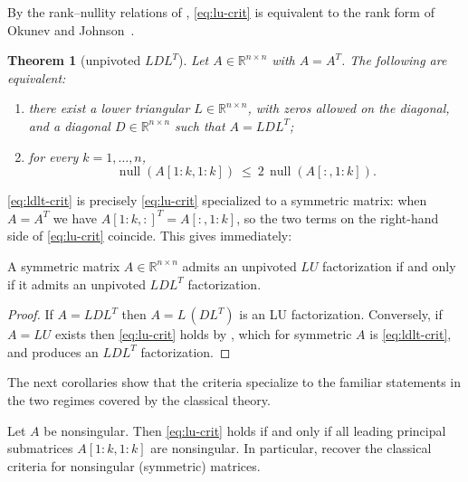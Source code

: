 \documentclass[preprint,12pt]{elsarticle}
\theoremstyle{plain}
\newtheorem{theorem}{Theorem}
\theoremstyle{nonumberplain}
\newtheorem{proof}{Proof}
\numberwithin{equation}{section}
\DeclareMathOperator{\nl}{null}
\newcommand{\by}{\times}
\numberwithin{theorem}{section}
\begin{document}
By the rank--nullity relations of , \cref{eq:lu-crit} is equivalent to the rank form of Okunev and Johnson~\cite{okunev_johnson_2005,johnson_okunev_2025}.

\begin{theorem}[unpivoted $LDL^T$]\label{thm:ldlt}
  Let $A \in \mathbb{R}^{n \by n}$ with $A = A^T$.  The following are equivalent:
  \begin{enumerate}
    \item there exist a lower triangular $L \in \mathbb{R}^{n \by n}$, with zeros allowed on the diagonal, and a diagonal $D \in \mathbb{R}^{n \by n}$ such that $A = LDL^T$;
    \item for every $k = 1, \ldots, n$,
      \begin{equation}\label{eq:ldlt-crit}
        \nl(A[1:k,1:k]) \ \le\ 2 \, \nl(A[:,1:k]) .
      \end{equation}
  \end{enumerate}
\end{theorem}

\cref{eq:ldlt-crit} is precisely \cref{eq:lu-crit} specialized to a symmetric matrix: when $A = A^T$ we have ${A[1:k,:]}^T = A[:,1:k]$, so the two terms on the right-hand side of \cref{eq:lu-crit} coincide.  This gives immediately:

\begin{corollary}\label{cor:sym-lu-ldlt}
  A symme\-tric matrix $A \in \mathbb{R}^{n \by n}$ admits an unpivoted $LU$ factorization if and only if it admits an unpivoted $LDL^T$ factorization.
\end{corollary}

\begin{proof}
  If $A = LDL^T$ then $A = L \, (DL^T)$ is an LU factorization.  Conversely, if $A = LU$ exists then \cref{eq:lu-crit} holds by , which for symmetric $A$ is \cref{eq:ldlt-crit}, and  produces an $LDL^T$ factorization.
\end{proof}

The next corollaries show that the criteria specialize to the familiar statements in the two regimes covered by the classical theory.

\begin{corollary}\label{cor:nonsingular}
  Let $A$ be nonsingular.  Then \cref{eq:lu-crit} holds if and only if all leading principal submatrices $A[1:k,1:k]$ are nonsingular.  In particular,  recover the classical criteria for nonsingular (symmetric) matrices.
\end{corollary}
\end{document}
